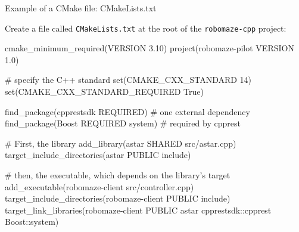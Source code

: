 \documentclass[compress]{beamer}
\begin{document}
\begin{frame}[fragile]{Example of a CMake file: CMakeLists.txt}

    Create a file called \texttt{CMakeLists.txt} at the root of the {\tt robomaze-cpp} project:

\begin{cmakecode}
cmake_minimum_required(VERSION 3.10)
project(robomaze-pilot VERSION 1.0)

# specify the C++ standard
set(CMAKE_CXX_STANDARD 14)
set(CMAKE_CXX_STANDARD_REQUIRED True)

find_package(cpprestsdk REQUIRED) # one external dependency
find_package(Boost REQUIRED system) # required by cpprest

# First, the library
add_library(astar SHARED src/astar.cpp)
target_include_directories(astar PUBLIC include)

# then, the executable, which depends on the library's target
add_executable(robomaze-client src/controller.cpp)
target_include_directories(robomaze-client PUBLIC include)
target_link_libraries(robomaze-client PUBLIC astar cpprestsdk::cpprest Boost::system)
\end{cmakecode}

\end{frame}
\end{document}
